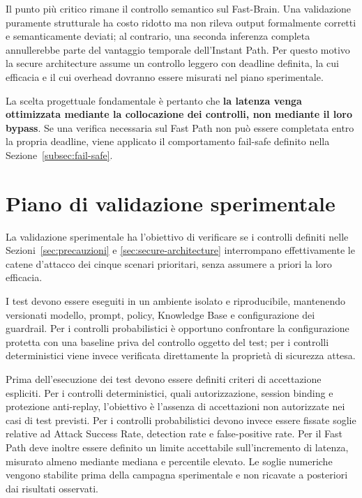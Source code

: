 \documentclass[11pt,a4paper]{article}
\begin{document}
\endgroup
Il punto più critico rimane il controllo semantico sul Fast-Brain.
Una validazione puramente strutturale ha costo ridotto ma non rileva
output formalmente corretti e semanticamente deviati; al contrario,
una seconda inferenza completa annullerebbe parte del vantaggio
temporale dell'Instant Path. Per questo motivo la secure architecture
assume un controllo leggero con deadline definita, la cui efficacia e
il cui overhead dovranno essere misurati nel piano sperimentale.

La scelta progettuale fondamentale è pertanto che
\textbf{la latenza venga ottimizzata mediante la collocazione dei
controlli, non mediante il loro bypass}. Se una verifica necessaria sul
Fast Path non può essere completata entro la propria deadline, viene
applicato il comportamento fail-safe definito nella
Sezione~\ref{subsec:fail-safe}.

\section{Piano di validazione sperimentale}
\label{sec:experimental-validation}

La validazione sperimentale ha l'obiettivo di verificare se i controlli
definiti nelle Sezioni~\ref{sec:precauzioni} e
\ref{sec:secure-architecture} interrompano effettivamente le catene
d'attacco dei cinque scenari prioritari, senza assumere a priori la loro
efficacia.

I test devono essere eseguiti in un ambiente isolato e riproducibile,
mantenendo versionati modello, prompt, policy, Knowledge Base e
configurazione dei guardrail. Per i controlli probabilistici è
opportuno confrontare la configurazione protetta con una baseline priva
del controllo oggetto del test; per i controlli deterministici viene
invece verificata direttamente la proprietà di sicurezza attesa.

Prima dell'esecuzione dei test devono essere definiti criteri di
accettazione espliciti. Per i controlli deterministici, quali
autorizzazione, session binding e protezione anti-replay, l'obiettivo è
l'assenza di accettazioni non autorizzate nei casi di test previsti.
Per i controlli probabilistici devono invece essere fissate soglie
relative ad Attack Success Rate, detection rate e false-positive rate.
Per il Fast Path deve inoltre essere definito un limite accettabile
sull'incremento di latenza, misurato almeno mediante mediana e percentile
elevato. Le soglie numeriche vengono stabilite prima della campagna
sperimentale e non ricavate a posteriori dai risultati osservati.
\end{document}
